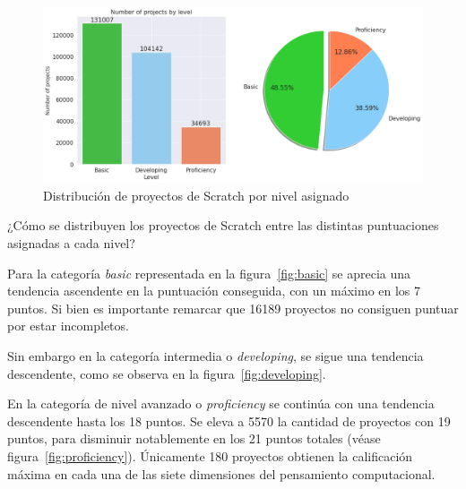 \documentclass[a4paper, 12pt]{book}
\begin{document}
\begin{figure}[H]
    \centering
    \includegraphics[width=1.0\textwidth]{img/freq_level_Scratch.png}
    \caption{Distribución de proyectos de Scratch por nivel asignado}\label{fig:level_Scratch}
\end{figure}

¿Cómo se distribuyen los proyectos de Scratch entre las distintas puntuaciones asignadas a cada nivel?

Para la categoría \emph{basic} representada en la figura~\ref{fig:basic} se aprecia una tendencia ascendente en la puntuación conseguida, con un máximo en los 7 puntos. Si bien es importante remarcar que 16189 proyectos no consiguen puntuar por estar incompletos.

Sin embargo en la categoría intermedia o \emph{developing}, se sigue una tendencia descendente, como se observa en la figura~\ref{fig:developing}.

En la categoría de nivel avanzado o \emph{proficiency} se continúa con una tendencia descendente hasta los 18 puntos. Se eleva a 5570 la cantidad de proyectos con 19 puntos, para disminuir notablemente en los 21 puntos totales (véase figura~\ref{fig:proficiency}). Únicamente 180 proyectos obtienen la calificación máxima en cada una de las siete dimensiones del pensamiento computacional. 
\end{document}
